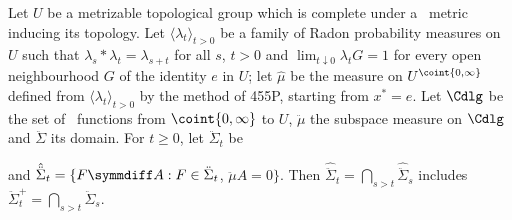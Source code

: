  Let $U$ be a metrizable
topological group which is complete
under a \rti\ metric inducing its topology.
Let $\langle\lambda_t\rangle_{t>0}$
be a family of Radon probability measures
on $U$ such that $\lambda_s*\lambda_t=\lambda_{s+t}$ for all $s$, $t>0$
and $\lim_{t\downarrow 0}\lambda_tG=1$ for every open
neighbourhood $G$ of the identity $e$ in $U$;
let $\hat\mu$ be the measure on $U^{\coint{0,\infty}}$ defined
from $\langle\lambda_t\rangle_{t>0}$ by the method of 455P, starting from
$x^*=e$.   Let $\Cdlg$ be the set of \cadlag\ functions from
$\coint{0,\infty}$ to $U$, $\ddot\mu$ the subspace measure on $\Cdlg$
and $\ddot\Sigma$ its domain.   For $t\ge 0$, let $\ddot\Sigma_t$ be


\noindent and
$\hat{\ddot\Sigma}_t=\{F\symmdiff A:F\in\ddot\Sigma_t$, $\ddot\mu A=0\}$.
Then $\hat{\ddot\Sigma}_t=\bigcap_{s>t}\hat{\ddot\Sigma}_s$ includes
$\ddot\Sigma^+_t=\bigcap_{s>t}\ddot\Sigma_s$.

